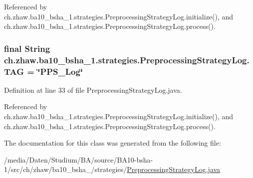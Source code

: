 Referenced by ch.zhaw.ba10\_\-bsha\_\-1.strategies.PreprocessingStrategyLog.initialize(), and ch.zhaw.ba10\_\-bsha\_\-1.strategies.PreprocessingStrategyLog.process().\hypertarget{classch_1_1zhaw_1_1ba10__bsha__1_1_1strategies_1_1PreprocessingStrategyLog_acb9148bfbd411f6bfae3ac2c6921925d}{
\subsubsection[{TAG}]{\setlength{\rightskip}{0pt plus 5cm}final String {\bf ch.zhaw.ba10\_\-bsha\_\-1.strategies.PreprocessingStrategyLog.TAG} = \char`\"{}PPS\_\-Log\char`\"{}}}
\label{classch_1_1zhaw_1_1ba10__bsha__1_1_1strategies_1_1PreprocessingStrategyLog_acb9148bfbd411f6bfae3ac2c6921925d}


Definition at line 33 of file PreprocessingStrategyLog.java.

Referenced by ch.zhaw.ba10\_\-bsha\_\-1.strategies.PreprocessingStrategyLog.initialize(), and ch.zhaw.ba10\_\-bsha\_\-1.strategies.PreprocessingStrategyLog.process().

The documentation for this class was generated from the following file:\begin{DoxyCompactItemize}
\item 
/media/Daten/Studium/BA/source/BA10-\/bsha-\/1/src/ch/zhaw/ba10\_\-bsha\_/strategies/\hyperlink{PreprocessingStrategyLog_8java}{PreprocessingStrategyLog.java}\end{DoxyCompactItemize}
